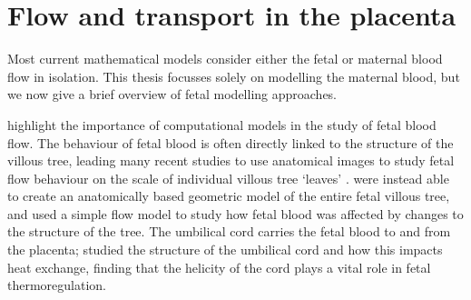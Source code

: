     \section{Flow and transport in the placenta}
        Most current mathematical models consider either the fetal or maternal blood flow in isolation. This thesis focusses solely on modelling the maternal blood, but we now give a brief overview of fetal modelling approaches.

        \citeauthor{zhangRecastingCurrentKnowledge2023} \cite{zhangRecastingCurrentKnowledge2023} highlight the importance of computational models in the study of fetal blood flow.
        The behaviour of fetal blood is often directly linked to the structure of the villous tree, leading many recent studies to use anatomical images to study fetal flow behaviour on the scale of individual villous tree `leaves' \cite{erlichPhysicalGeometricDeterminants2019,erlichQuantifyingImpactTissue2019,pearceImageBasedModelingBlood2016,plitmanmayoThreedimensionalModelingHuman2016}. \citeauthor{clarkMultiscaleModellingFeto2015} \cite{clarkMultiscaleModellingFeto2015} were instead able to create an anatomically based geometric model of the entire fetal villous tree, and used a simple flow model to study how fetal blood was affected by changes to the structure of the tree. The umbilical cord carries the fetal blood to and from the placenta; \citeauthor{kasiteropoulouComputationalFluidDynamics2020} \cite{kasiteropoulouComputationalFluidDynamics2020} studied the structure of the umbilical cord and how this impacts heat exchange, finding that the helicity of the cord plays a vital role in fetal thermoregulation.

